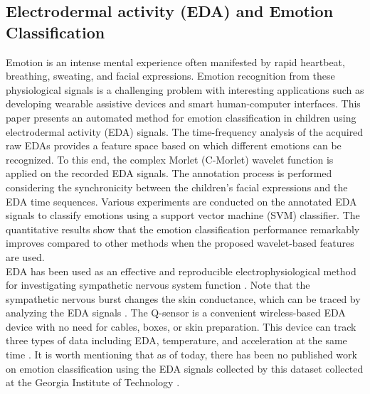 \documentclass[conference]{IEEEtran}
\begin{document}
\subsection{Electrodermal activity (EDA) and Emotion Classification}
Emotion is an intense mental experience often manifested by rapid heartbeat, breathing, 
sweating, and facial expressions. Emotion recognition from these physiological signals 
is a challenging problem with interesting applications such as developing wearable 
assistive devices and smart human-computer interfaces. This paper presents an automated 
method for emotion classification in children using electrodermal activity (EDA) signals. 
The time-frequency analysis of the acquired raw EDAs provides a feature space based on 
which different emotions can be recognized. To this end, the complex Morlet (C-Morlet) 
wavelet function is applied on the recorded EDA signals. 
The annotation process is performed 
considering the synchronicity between the children's facial expressions and the EDA 
time sequences. Various experiments are conducted on the annotated EDA signals to 
classify emotions using a support vector machine (SVM) classifier. The quantitative 
results show that the emotion classification performance remarkably improves compared 
to other methods when the proposed wavelet-based features are used.\\

EDA has been used as an effective and reproducible electrophysiological method for 
investigating sympathetic nervous system function \cite{WearableDevice2016, 
	AssociationBetween2013, SympatheticSkin1984, PrincipalComponent2000}. Note that the sympathetic nervous 
burst changes the skin conductance, which can be traced by analyzing the EDA signals
\cite{SkinConduct2006, SympatheticSkin1981, DecodeChild2013}. The Q-sensor 
is a convenient wireless-based EDA device with no need for cables, boxes, or skin 
preparation. This device can track three types of data including EDA, temperature, 
and acceleration at the same time \cite{Validation2013}. It is worth mentioning that 
as of today, there has been no published work on emotion classification using the 
EDA signals collected by this dataset collected at the Georgia Institute of 
Technology \cite{DecodeChild2013}.\\
\end{document}
